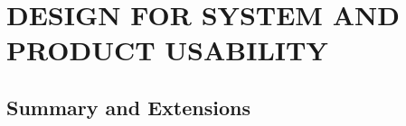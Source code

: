 \chapter{DESIGN FOR SYSTEM AND PRODUCT USABILITY}\label{chap:19}


\section{Summary and Extensions}

